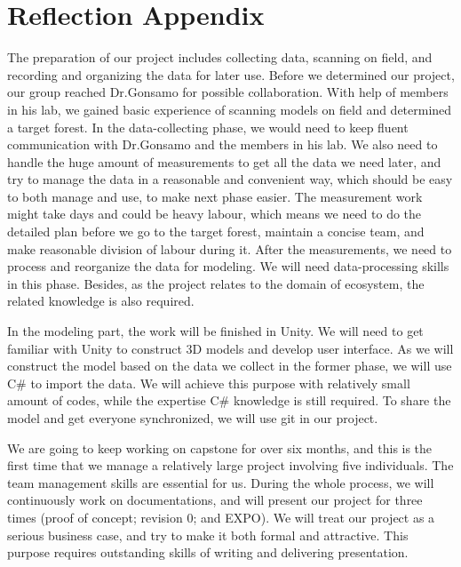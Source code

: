 \documentclass{article}
\begin{document}
\newpage

\appendix
\section{Reflection Appendix}

The preparation of our project includes collecting data, scanning on field, and recording and organizing the data for later use. Before we determined our project, our group reached Dr.Gonsamo for possible collaboration. With help of members in his lab, we gained basic experience of scanning models on field and determined a target forest. In the data-collecting phase, we would need to keep fluent communication with Dr.Gonsamo and the members in his lab. We also need to handle the huge amount of measurements to get all the data we need later, and try to manage the data in a reasonable and convenient way, which should be easy to both manage and use, to make next phase easier. The measurement work might take days and could be heavy labour, which means we need to do the detailed plan before we go to the target forest, maintain a concise team, and make reasonable division of labour during it. After the measurements, we need to process and reorganize the data for modeling. We will need data-processing skills in this phase. Besides, as the project relates to the domain of ecosystem, the related knowledge is also required. 

In the modeling part, the work will be finished in Unity. We will need to get familiar with Unity to construct 3D models and develop user interface. As we will construct the model based on the data we collect in the former phase, we will use C\# to import the data. We will achieve this purpose with relatively small amount of codes, while the expertise C\# knowledge is still required. To share the model and get everyone synchronized, we will use git in our project. 

We are going to keep working on capstone for over six months, and this is the first time that we manage a relatively large project involving five individuals. The team management skills are essential for us. During the whole process, we will continuously work on documentations, and will present our project for three times (proof of concept; revision 0; and EXPO). We will treat our project as a serious business case, and try to make it both formal and attractive. This purpose requires outstanding skills of writing and delivering presentation. 
\end{document}
